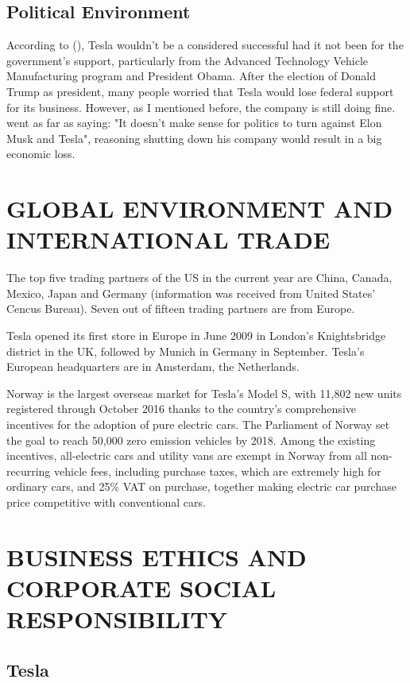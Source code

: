 \documentclass[12pt]{article}
\begin{document}
\subsection{Political Environment}

According to (\cite{ko13}), Tesla wouldn't be a considered successful had it not been for the government's support, particularly from the Advanced Technology Vehicle Manufacturing program and President Obama. After the election of Donald Trump as president, many people worried that Tesla would lose federal support for its business. However, as I mentioned before, the company is still doing fine. \textcite{de16} went as far as saying: "It doesn't make sense for politics to turn against Elon Musk and Tesla", reasoning shutting down his company would result in a big economic loss.

\section{GLOBAL ENVIRONMENT AND INTERNATIONAL TRADE}

The top five trading partners of the US in the current year are China, Canada, Mexico, Japan and Germany (information was received from United States' Cencus Bureau). Seven out of fifteen trading partners are from Europe.

Tesla opened its first store in Europe in June 2009 in London's Knightsbridge district in the UK, followed by Munich in Germany in September. Tesla's European headquarters are in Amsterdam, the Netherlands.

Norway is the largest overseas market for Tesla's Model S, with 11,802 new units registered through October 2016 thanks to the country's comprehensive incentives for the adoption of pure electric cars. The Parliament of Norway set the goal to reach 50,000 zero emission vehicles by 2018. Among the existing incentives, all-electric cars and utility vans are exempt in Norway from all non-recurring vehicle fees, including purchase taxes, which are extremely high for ordinary cars, and 25\% VAT on purchase, together making electric car purchase price competitive with conventional cars.

\section{BUSINESS ETHICS AND CORPORATE SOCIAL RESPONSIBILITY}

\subsection{Tesla}
\end{document}
